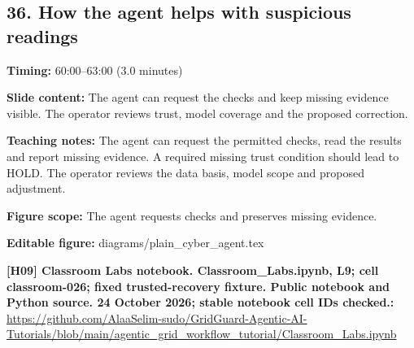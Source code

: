 \documentclass[10pt,letterpaper]{article}
\begin{document}
\subsection*{36. How the agent helps with suspicious readings}
\textbf{Timing:} 60:00--63:00 (3.0 minutes)\par
\textbf{Slide content:} The agent can request the checks and keep missing evidence visible.
The operator reviews trust, model coverage and the proposed correction.\par
\textbf{Teaching notes:} The agent can request the permitted checks, read the results and report missing evidence. A required missing trust condition should lead to HOLD. The operator reviews the data basis, model scope and proposed adjustment.\par
\textbf{Figure scope:} The agent requests checks and preserves missing evidence.\par
\textbf{Editable figure:} diagrams/plain\_cyber\_agent.tex\par
\textbf{[H09] Classroom Labs notebook. Classroom\_Labs.ipynb, L9; cell classroom-026; fixed trusted-recovery fixture. Public notebook and Python source. 24 October 2026; stable notebook cell IDs checked.:} \href{https://github.com/AlaaSelim-sudo/GridGuard-Agentic-AI-Tutorials/blob/main/agentic_grid_workflow_tutorial/Classroom_Labs.ipynb}{\small\ttfamily https:/\allowbreak{}/\allowbreak{}github.\allowbreak{}com/\allowbreak{}AlaaSelim-\allowbreak{}sudo/\allowbreak{}GridGuard-\allowbreak{}Agentic-\allowbreak{}AI-\allowbreak{}Tutorials/\allowbreak{}blob/\allowbreak{}main/\allowbreak{}agentic\_\allowbreak{}grid\_\allowbreak{}workflow\_\allowbreak{}tutorial/\allowbreak{}Classroom\_\allowbreak{}Labs.\allowbreak{}ipynb}\par
\par\medskip
\end{document}
